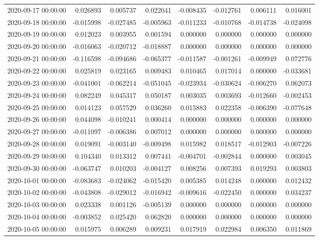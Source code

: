 \begin{tabular}{lrrrrrrr}
2020-09-17 00:00:00 & 0.026893 & 0.005737 & 0.022041 & -0.008435 & -0.012761 & 0.006111 & 0.016001 \\
2020-09-18 00:00:00 & -0.015998 & -0.027485 & -0.005963 & -0.011233 & -0.010768 & -0.014738 & -0.024098 \\
2020-09-19 00:00:00 & 0.012023 & 0.003955 & 0.001594 & 0.000000 & 0.000000 & 0.000000 & 0.000000 \\
2020-09-20 00:00:00 & -0.016063 & -0.020712 & -0.018887 & 0.000000 & 0.000000 & 0.000000 & 0.000000 \\
2020-09-21 00:00:00 & -0.116598 & -0.094686 & -0.065377 & -0.011587 & -0.001261 & -0.009949 & 0.072776 \\
2020-09-22 00:00:00 & 0.025819 & 0.023165 & 0.009483 & 0.010465 & 0.017014 & 0.000000 & -0.033681 \\
2020-09-23 00:00:00 & -0.041001 & -0.062214 & -0.051045 & -0.023934 & -0.030624 & -0.006270 & 0.062073 \\
2020-09-24 00:00:00 & 0.082249 & 0.045317 & 0.050187 & 0.003035 & 0.003693 & -0.012660 & -0.002453 \\
2020-09-25 00:00:00 & 0.014123 & 0.057529 & 0.036260 & 0.015883 & 0.022358 & -0.006390 & -0.077648 \\
2020-09-26 00:00:00 & 0.044098 & -0.010241 & 0.000414 & 0.000000 & 0.000000 & 0.000000 & 0.000000 \\
2020-09-27 00:00:00 & -0.011097 & -0.006386 & 0.007012 & 0.000000 & 0.000000 & 0.000000 & 0.000000 \\
2020-09-28 00:00:00 & 0.019091 & -0.003140 & -0.009498 & 0.015982 & 0.018517 & -0.012903 & -0.007226 \\
2020-09-29 00:00:00 & 0.104340 & 0.013312 & 0.007441 & -0.004701 & -0.002844 & 0.000000 & 0.003045 \\
2020-09-30 00:00:00 & -0.063747 & 0.010203 & -0.004127 & 0.008256 & 0.007393 & 0.019293 & 0.003803 \\
2020-10-01 00:00:00 & -0.083683 & -0.024062 & -0.015420 & 0.005385 & 0.014248 & 0.000000 & 0.012432 \\
2020-10-02 00:00:00 & -0.043808 & -0.029012 & -0.016942 & -0.009616 & -0.022450 & 0.000000 & 0.034237 \\
2020-10-03 00:00:00 & 0.023338 & 0.001126 & -0.005139 & 0.000000 & 0.000000 & 0.000000 & 0.000000 \\
2020-10-04 00:00:00 & -0.003852 & 0.025420 & 0.062820 & 0.000000 & 0.000000 & 0.000000 & 0.000000 \\
2020-10-05 00:00:00 & 0.015975 & 0.006289 & 0.009231 & 0.017919 & 0.022984 & 0.006350 & 0.011869 \\

\end{tabular}
